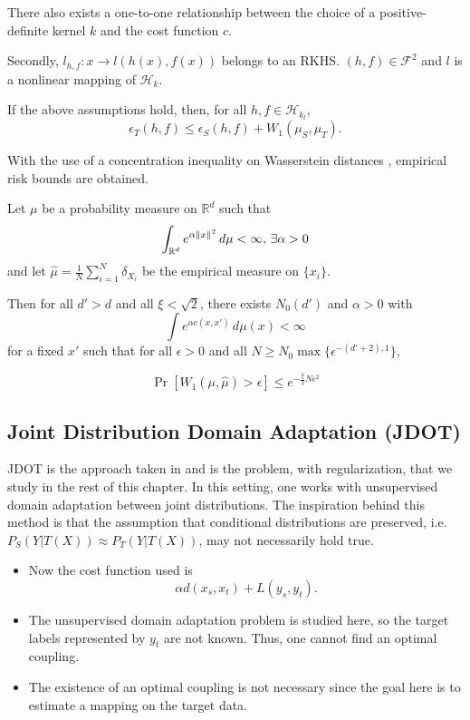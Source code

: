 There also exists a one-to-one relationship between the choice of a positive-definite kernel $k$ and the cost function $c$.

Secondly, $l_{h,f}:x\to l(h(x),f(x))$ belongs to an RKHS. $(h,f)\in \mathcal{F}^2$ and $l$ is a nonlinear mapping of $\mathcal{H}_k$.

\medskip

\begin{lemma}
	If the above assumptions hold, then, for all $h,f\in \mathcal{H}_{k_l}$, 
	\[ \epsilon_T(h,f)\leq \epsilon_S(h,f) + W_1(\mu_S,\mu_T). \]
\end{lemma}

With the use of a concentration inequality on Wasserstein distances \cite{Bolley2007}, empirical risk bounds are obtained.

\begin{theorem}
	Let $\mu$ be a probability measure on $\mathbb{R}^d$ such that
	\[
	\int_{\mathbb{R}^d} e^{\alpha \lVert x\rVert^2}\,d\mu < \infty, \, \exists \alpha > 0
	\]
	and let $\hat{\mu}=\frac{1}{N}\sum_{i=1}^N \delta_{X_i}$ be the empirical measure on $\{x_i\}$.
	
	Then for all $d'>d$ and all $\xi < \sqrt{2}$, there exists $N_0(d')$ and $\alpha > 0$ with
	\[
	\int e^{\alpha c(x,x')}\,d\mu(x) < \infty
	\]
	for a fixed $x'$ such that for all $\epsilon > 0$ and all $N\geq N_0 \max \{\epsilon^{-(d'+2),1}\}$,
	
	\[
	\Pr[W_1(\mu,\hat{\mu})>\epsilon] \leq e^{-\frac{\xi}{2} N\epsilon^2}
	\]
\end{theorem}

\subsection*{Joint Distribution Domain Adaptation (JDOT)}
JDOT is the approach taken in \cite{Courty2017} and is the problem, with regularization, that we study in the rest of this chapter. In this setting, one works with unsupervised domain adaptation between joint distributions. The inspiration behind this method is that the assumption that  conditional distributions are preserved, i.e. $P_S(Y|T(X))\approx P_T(Y|T(X))$, may not necessarily hold true.
\begin{itemize}
	\item Now the cost function used is \[\alpha d(x_s,x_t) + L(y_s,y_t).\]
	\item The unsupervised domain adaptation problem is studied here, so the target labels represented by $y_t$ are not known. Thus, one cannot find an optimal coupling.
	\item The existence of an optimal coupling is not necessary since the goal here is to estimate a mapping on the target data.
\end{itemize}

